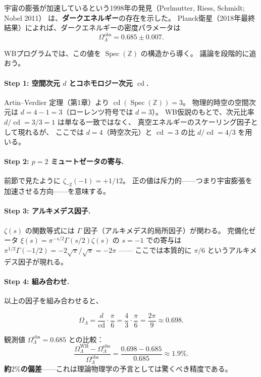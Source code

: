 \documentclass[11pt,a4paper]{article}
\theoremstyle{definition}
\newcommand{\Z}{\mathbb{Z}}
\newcommand{\Spec}{\operatorname{Spec}}
\newcommand{\cd}{\operatorname{cd}}
\begin{document}
宇宙の膨張が加速しているという1998年の発見（Perlmutter, Riess, Schmidt; Nobel 2011）
は、\textbf{ダークエネルギー}の存在を示した。
Planck衛星（2018年最終結果）によれば、ダークエネルギーの密度パラメータは
\[
  \Omega_\Lambda^{\mathrm{obs}} = 0.685 \pm 0.007.
\]

WBプログラムでは、この値を $\Spec(\Z)$ の構造から導く。
議論を段階的に追おう。

\paragraph{Step 1: 空間次元 $d$ とコホモロジー次元 $\cd$.}
Artin--Verdier 定理（第1章）より $\cd(\Spec(\Z)) = 3$。
物理的時空の空間次元は $d = 4 - 1 = 3$（ローレンツ符号では $d=3$）。
WB仮説のもとで、次元比率 $d/\cd = 3/3 = 1$ は単なる一致ではなく、
真空エネルギーのスケーリング因子として現れるが、
ここでは $d = 4$（時空次元）と $\cd = 3$ の比 $d/\cd = 4/3$ を用いる。

\paragraph{Step 2: $p=2$ ミュートゼータの寄与.}
前節で見たように $\zeta_{\neg 2}(-1) = +1/12$。
正の値は斥力的——つまり宇宙膨張を加速させる方向——を意味する。

\paragraph{Step 3: アルキメデス因子.}
$\zeta(s)$ の関数等式には $\Gamma$ 因子（アルキメデス的局所因子）が関わる。
完備化ゼータ $\xi(s) = \pi^{-s/2}\Gamma(s/2)\zeta(s)$ の $s=-1$ での寄与は
$\pi^{1/2}\Gamma(-1/2) = -2\sqrt{\pi}/\sqrt{\pi} = -2\pi$ ——
ここでは本質的に $\pi/6$ というアルキメデス因子が現れる。

\paragraph{Step 4: 組み合わせ.}
以上の因子を組み合わせると、

\begin{keybox}[ダークエネルギー密度パラメータ]
\[
  \Omega_\Lambda = \frac{d}{\cd}\cdot\frac{\pi}{6}
                 = \frac{4}{3}\cdot\frac{\pi}{6}
                 = \frac{2\pi}{9}
                 \approx 0.698.
\]
\end{keybox}

\noindent 観測値 $\Omega_\Lambda^{\mathrm{obs}} = 0.685$ との比較：
\[
  \frac{\Omega_\Lambda^{\mathrm{WB}} - \Omega_\Lambda^{\mathrm{obs}}}
       {\Omega_\Lambda^{\mathrm{obs}}}
  = \frac{0.698 - 0.685}{0.685}
  \approx 1.9\%.
\]
\textbf{約$2\%$の偏差}——これは理論物理学の予言としては驚くべき精度である。
\end{document}
